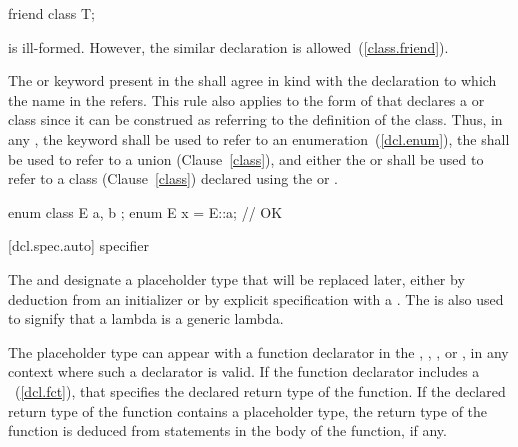 \begin{codeblock}
friend class T;
\end{codeblock}

is ill-formed. However, the similar declaration  is allowed~(\ref{class.friend}).
\exitnote

\pnum
The  or  keyword
present in the
 shall agree in kind with the
declaration to which the name in the
 refers. This rule also applies to
the form of  that declares a
 or  class since it can be construed
as referring to the definition of the class. Thus, in any
, the  keyword
shall be
used to refer to an enumeration~(\ref{dcl.enum}), the 
 shall be used to refer to a union
(Clause~\ref{class}), and either the  or 
 shall be used to refer to a class
(Clause~\ref{class}) declared using the  or 
. \enterexample

\begin{codeblock}
enum class E { a, b };
enum E x = E::a;                // OK
\end{codeblock}
\exitexample

[dcl.spec.auto]{ specifier}%

\pnum
The  and  
designate a placeholder type that will be replaced later, either by deduction
from an initializer or by explicit specification with a
. The 
 is also used to signify that a lambda is a
generic lambda.

\pnum
The placeholder type can appear with a function declarator in the
, ,
, or ,
in any context where such a declarator is valid. If the function declarator
includes a ~(\ref{dcl.fct}), that specifies
the declared return type of the function. If the declared return type of the
function contains a placeholder type, the return type of the function is
deduced from  statements in the body of the function, if any.

